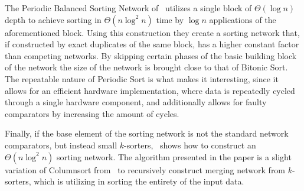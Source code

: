 The Periodic Balanced Sorting Network of~ utilizes a single block of $\Theta(\log n)$ depth to achieve sorting in $\Theta(n \log^2 n)$ time by $\log n$ applications of the aforementioned block. Using this construction they create a sorting network that, if constructed by exact duplicates of the same block, has a higher constant factor than competing networks. By skipping certain phases of the basic building block of the network the size of the network is brought close to that of Bitonic Sort. The repeatable nature of Periodic Sort is what makes it interesting, since it allows for an efficient hardware implementation, where data is repeatedly cycled through a single hardware component, and additionally allows for faulty comparators by increasing the amount of cycles.

Finally, if the base element of the sorting network is not the standard network comparators, but instead small $k$-sorters,~ shows how to construct an $\Theta(n \log^2 n)$ sorting network. The algorithm presented in the paper is a slight variation of Columnsort from~ to recursively construct merging network from $k$-sorters, which is utilizing in sorting the entirety of the input data.
